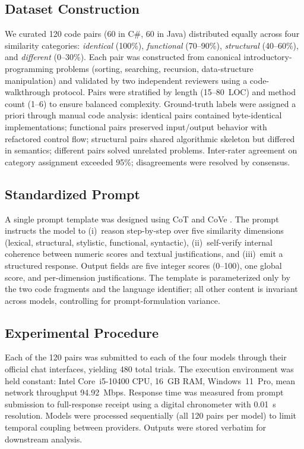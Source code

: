 \documentclass[twocolumn,11pt]{article}
\begin{document}
    \subsection{Dataset Construction}
    We curated 120 code pairs (60 in C\#, 60 in Java) distributed equally across four similarity categories: \emph{identical} (100\%), \emph{functional} (70--90\%), \emph{structural} (40--60\%), and \emph{different} (0--30\%). Each pair was constructed from canonical introductory-programming problems (sorting, searching, recursion, data-structure manipulation) and validated by two independent reviewers using a code-walkthrough protocol. Pairs were stratified by length (15--80~LOC) and method count (1--6) to ensure balanced complexity. Ground-truth labels were assigned a priori through manual code analysis: identical pairs contained byte-identical implementations; functional pairs preserved input/output behavior with refactored control flow; structural pairs shared algorithmic skeleton but differed in semantics; different pairs solved unrelated problems. Inter-rater agreement on category assignment exceeded 95\%; disagreements were resolved by consensus.
    \subsection{Standardized Prompt}
    A single prompt template was designed using CoT \citep{wei2022chain} and CoVe \citep{dhuliawala2024chain}. The prompt instructs the model to (i)~reason step-by-step over five similarity dimensions (lexical, structural, stylistic, functional, syntactic), (ii)~self-verify internal coherence between numeric scores and textual justifications, and (iii)~emit a structured response. Output fields are five integer scores (0--100), one global score, and per-dimension justifications. The template is parameterized only by the two code fragments and the language identifier; all other content is invariant across models, controlling for prompt-formulation variance.
    \subsection{Experimental Procedure}
    Each of the 120 pairs was submitted to each of the four models through their official chat interfaces, yielding 480 total trials. The execution environment was held constant: Intel Core~i5-10400 CPU, 16~GB RAM, Windows~11~Pro, mean network throughput 94.92~Mbps. Response time was measured from prompt submission to full-response receipt using a digital chronometer with 0.01~s resolution. Models were processed sequentially (all 120 pairs per model) to limit temporal coupling between providers. Outputs were stored verbatim for downstream analysis.
\end{document}
